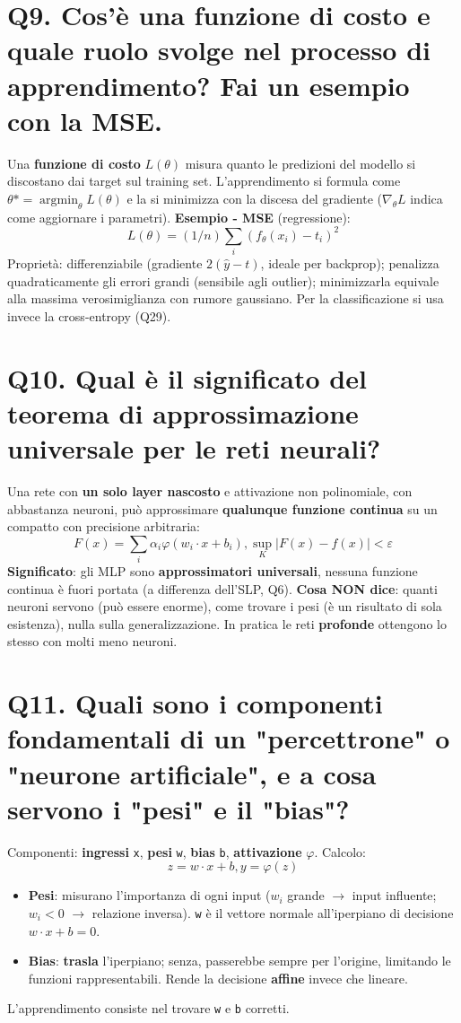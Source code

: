 \documentclass[11pt,a4paper]{article}
\begin{document}
\section*{Q9. Cos'è una funzione di costo e quale ruolo svolge nel processo di apprendimento? Fai un esempio con la MSE.}
Una \textbf{funzione di costo} $L(\theta )$ misura quanto le predizioni del modello si discostano dai target sul training set. L'apprendimento si formula come $\theta * = \operatorname{argmin}_\theta  L(\theta )$ e la si minimizza con la discesa del gradiente ($\nabla _\theta  L$ indica come aggiornare i parametri).
\textbf{Esempio - MSE} (regressione):
\[ L(\theta ) = (1/n) \sum _{i} (f_\theta (x_{i}) - t_{i})^{2} \]
Proprietà: differenziabile (gradiente $2(\hat{y}-t)$, ideale per backprop); penalizza quadraticamente gli errori grandi (sensibile agli outlier); minimizzarla equivale alla massima verosimiglianza con rumore gaussiano. Per la classificazione si usa invece la cross-entropy (Q29).
\newpage
\section*{Q10. Qual è il significato del teorema di approssimazione universale per le reti neurali?}
Una rete con \textbf{un solo layer nascosto} e attivazione non polinomiale, con abbastanza neuroni, può approssimare \textbf{qualunque funzione continua} su un compatto con precisione arbitraria:
\[ F(x) = \sum _{i} \alpha _{i} \varphi (w_{i}\cdot x + b_{i}),   \operatorname{sup}_K |F(x) - f(x)| < \varepsilon  \]
\textbf{Significato}: gli MLP sono \textbf{approssimatori universali}, nessuna funzione continua è fuori portata (a differenza dell'SLP, Q6).
\textbf{Cosa NON dice}: quanti neuroni servono (può essere enorme), come trovare i pesi (è un risultato di sola esistenza), nulla sulla generalizzazione. In pratica le reti \textbf{profonde} ottengono lo stesso con molti meno neuroni.
\newpage
\section*{Q11. Quali sono i componenti fondamentali di un "percettrone" o "neurone artificiale", e a cosa servono i "pesi" e il "bias"?}
Componenti: \textbf{ingressi} \texttt{x}, \textbf{pesi} \texttt{w}, \textbf{bias} \texttt{b}, \textbf{attivazione} $\varphi $. Calcolo:
\[ z = w \cdot  x + b,   y = \varphi (z) \]
\begin{itemize}
\item \textbf{Pesi}: misurano l'importanza di ogni input ($w_{i}$ grande $\to $ input influente; $w_{i}<0$ $\to $ relazione inversa). \texttt{w} è il vettore normale all'iperpiano di decisione $w\cdot x+b=0$.
\item \textbf{Bias}: \textbf{trasla} l'iperpiano; senza, passerebbe sempre per l'origine, limitando le funzioni rappresentabili. Rende la decisione \textbf{affine} invece che lineare.
\end{itemize}
L'apprendimento consiste nel trovare \texttt{w} e \texttt{b} corretti.
\newpage
\end{document}
